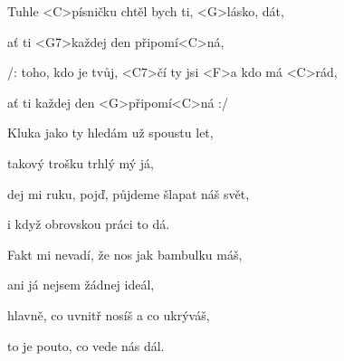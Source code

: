 

\zr
Tuhle <C>písničku chtěl bych ti, <G>lásko, dát,

ať ti <G7>každej den připomí<C>ná,

/: toho, {kdo} je tvůj, <C7>čí ty jsi <F>a kdo má <C>rád,

ať ti každej den <G>připomí<C>ná :/
\kr

\zs
{Kluka} jako ty hledám už {spoustu} let,

tako{vý} trošku trhlý mý {já},

dej mi {ruku}, pojď, půjdeme {šlapat} náš {svět},

{i} když obrovskou {práci} to {dá}.
\ks

\zr
\kr

\zs
Fakt mi nevadí, že nos jak bambulku máš,

ani já nejsem žádnej ideál,

hlavně, co uvnitř nosíš a co ukrýváš,

to je pouto, co vede nás dál.
\ks

\zr
\kr

\kp


























